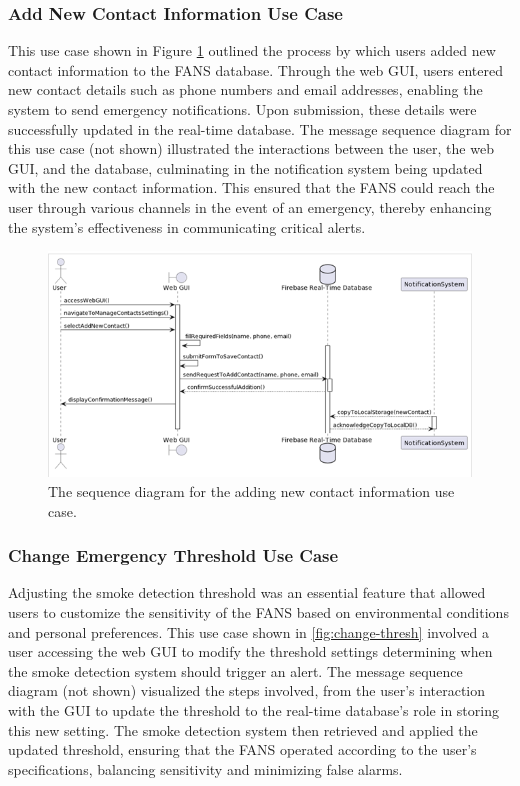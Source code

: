 \subsubsection{Add New Contact Information Use Case}

This use case shown in Figure \ref{fig:add-contact} outlined the process by which users added new contact information
to the FANS database. Through the web GUI, users entered new contact details such as phone numbers and email addresses,
enabling the system to send emergency notifications. Upon submission, these details were successfully updated in the
real-time database. The message sequence diagram for this use case (not shown) illustrated the interactions between the
user, the web GUI, and the database, culminating in the notification system being updated with the new contact
information. This ensured that the FANS could reach the user through various channels in the event of an emergency,
thereby enhancing the system’s effectiveness in communicating critical alerts.

\begin{figure}
    \centering
    \includegraphics[width=\imagewidth]{../assets/sequence/AddingNewContactInformationSequenceDiagram.png}
    \caption{The sequence diagram for the adding new contact information use case.}
    \label{fig:add-contact}
\end{figure}

\subsubsection{Change Emergency Threshold Use Case}

Adjusting the smoke detection threshold was an essential feature that allowed users to customize the sensitivity of the
FANS based on environmental conditions and personal preferences. This use case shown in \ref{fig:change-thresh}
involved a user accessing the web GUI to modify the threshold settings determining when the smoke detection system
should trigger an alert. The message sequence diagram (not shown) visualized the steps involved, from the user’s
interaction with the GUI to update the threshold to the real-time database’s role in storing this new setting. The
smoke detection system then retrieved and applied the updated threshold, ensuring that the FANS operated according to
the user’s specifications, balancing sensitivity and minimizing false alarms.

